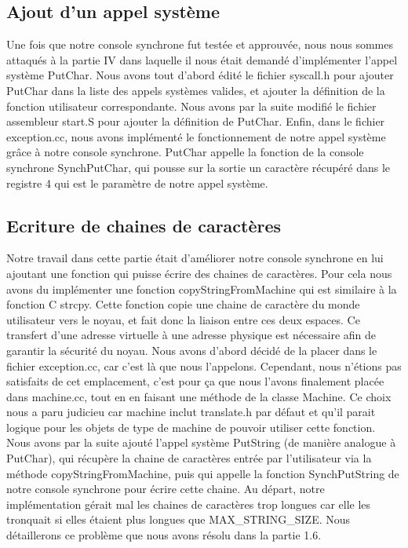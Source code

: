 \documentclass[12pt]{article}
\begin{document}
\subsection{Ajout d'un appel système}
Une fois que notre console synchrone fut testée et approuvée, nous nous sommes attaqués à la partie IV dans laquelle il nous était demandé d'implémenter l'appel système \textcolor{blue2}{PutChar}.
Nous avons tout d'abord édité le fichier \textcolor{vert2}{syscall.h} pour ajouter \textcolor{blue2}{PutChar} dans la liste des appels systèmes valides, et ajouter la définition de la fonction utilisateur correspondante.
\newline
Nous avons par la suite modifié le fichier assembleur \textcolor{vert2}{start.S} pour ajouter la définition de \textcolor{blue2}{PutChar}.
Enfin, dans le fichier \textcolor{vert2}{exception.cc}, nous avons implémenté le fonctionnement de notre appel système grâce à notre console synchrone. \textcolor{blue2}{PutChar} appelle la fonction de la console synchrone \textcolor{red2}{SynchPutChar}, qui pousse sur la sortie un caractère récupéré dans le registre 4 qui est le paramètre de notre appel système.

\bigbreak
\subsection{Ecriture de chaines de caractères}
Notre travail dans cette partie était d'améliorer notre console synchrone en lui ajoutant une fonction qui puisse écrire des chaines de caractères. Pour cela nous avons du implémenter une fonction \textcolor{red2}{copyStringFromMachine} qui est similaire à la fonction C \textcolor{red2}{strcpy}. Cette fonction copie une chaine de caractère du monde utilisateur vers le noyau, et fait donc la liaison entre ces deux espaces.
Ce transfert d'une adresse virtuelle à une adresse physique est nécessaire afin de garantir la sécurité du noyau.
\newline \newline
Nous avons d'abord décidé de la placer dans le fichier \textcolor{vert2}{exception.cc}, car c'est là que nous l'appelons. Cependant, nous n'étions pas satisfaits de cet emplacement, c'est pour ça que nous l'avons finalement placée dans \textcolor{vert2}{machine.cc}, tout en en faisant une méthode de la classe Machine.
Ce choix nous a paru judicieu car machine inclut translate.h par défaut et qu'il parait logique pour les objets de type de machine de pouvoir utiliser cette fonction.
\newline \newline
Nous avons par la suite ajouté l'appel système \textcolor{blue2}{PutString} (de manière analogue à \textcolor{blue2}{PutChar}), qui récupère la chaine de caractères entrée par l'utilisateur via la méthode \textcolor{red2}{copyStringFromMachine}, puis qui appelle la fonction \textcolor{red2}{SynchPutString} de notre console synchrone pour écrire cette chaine.
Au départ, notre implémentation gérait mal les chaines de caractères trop longues car elle les tronquait si elles étaient plus longues que MAX\_STRING\_SIZE. Nous détaillerons ce problème que nous avons résolu dans la partie 1.6.
\end{document}
